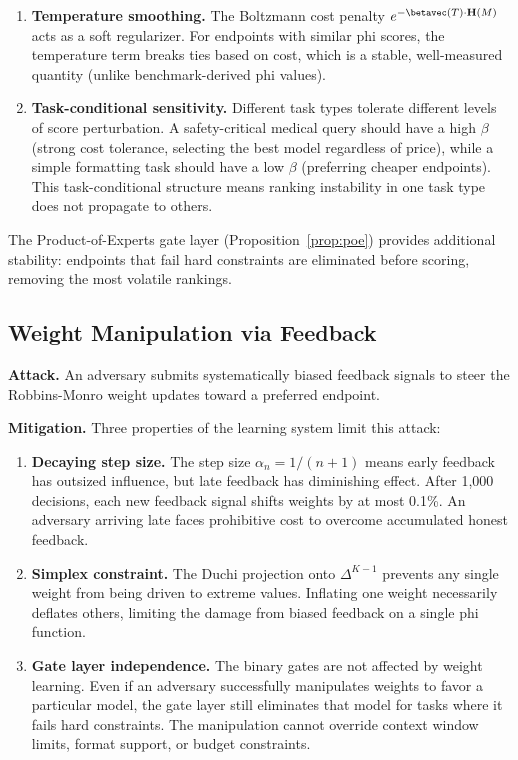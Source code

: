 \begin{enumerate}
    \item \textbf{Temperature smoothing.} The Boltzmann cost penalty $e^{-\betavec(T) \cdot \mathbf{H}(M)}$ acts as a soft regularizer. For endpoints with similar phi scores, the temperature term breaks ties based on cost, which is a stable, well-measured quantity (unlike benchmark-derived phi values).

    \item \textbf{Task-conditional sensitivity.} Different task types tolerate different levels of score perturbation. A safety-critical medical query should have a high $\beta$ (strong cost tolerance, selecting the best model regardless of price), while a simple formatting task should have a low $\beta$ (preferring cheaper endpoints). This task-conditional structure means ranking instability in one task type does not propagate to others.
\end{enumerate}

The Product-of-Experts gate layer (Proposition~\ref{prop:poe}) provides additional stability: endpoints that fail hard constraints are eliminated before scoring, removing the most volatile rankings.

\subsection{Weight Manipulation via Feedback}

\textbf{Attack.} An adversary submits systematically biased feedback signals to steer the Robbins-Monro weight updates toward a preferred endpoint.

\textbf{Mitigation.} Three properties of the learning system limit this attack:

\begin{enumerate}
    \item \textbf{Decaying step size.} The step size $\alpha_n = 1/(n+1)$ means early feedback has outsized influence, but late feedback has diminishing effect. After 1,000 decisions, each new feedback signal shifts weights by at most 0.1\%. An adversary arriving late faces prohibitive cost to overcome accumulated honest feedback.

    \item \textbf{Simplex constraint.} The Duchi projection onto $\Delta^{K-1}$ prevents any single weight from being driven to extreme values. Inflating one weight necessarily deflates others, limiting the damage from biased feedback on a single phi function.

    \item \textbf{Gate layer independence.} The binary gates are not affected by weight learning. Even if an adversary successfully manipulates weights to favor a particular model, the gate layer still eliminates that model for tasks where it fails hard constraints. The manipulation cannot override context window limits, format support, or budget constraints.
\end{enumerate}

